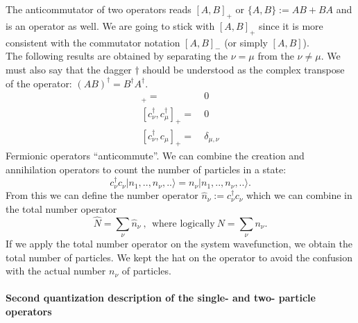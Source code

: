 \documentclass[../main.tex]{subfile}
\begin{document}
The anticommutator of two operators reads $[A,B]_{+}$ or $\{A,B\} := AB + BA$ and is an operator as well.
We are going to stick with $[A,B]_{+}$ since it is more consistent with the commutator notation $[A,B]_{-}$ (or simply $[A,B]$).\\

The following results are obtained by separating the $\nu = \mu$ from the $\nu \neq \mu$. We must also say that the dagger $\dagger$ 
should be understood as the complex transpose of the operator: $(AB)^{\dagger} = B^{\dagger}A^{\dagger}$.
\begin{align}
    [c_{\nu},c_{\mu}]_+ =&~ 0 \label{eq:Fermion1} \\
    [c^{\dagger}_{\nu},c^{\dagger}_{\mu}]_+ =&~0 \label{eq:Fermion2} \\
    [c^{\dagger}_{\nu},c_{\mu}]_+ =&~ \delta_{\mu,\nu}\label{eq:Fermion3} 
\end{align} 
Fermionic operators ``anticommute''.
We can combine the creation and annihilation operators to count the number of particles in a state:
\[
    c_{\nu}^{\dagger} c_{\nu} |n_{1},..,n_{\nu},..\rangle = n_{\nu}|n_{1},..,n_{\nu},..\rangle.
\]  
From this we can define the number operator $\hat{n}_{\nu}:= c_{\nu}^{\dagger} c_{\nu}$ which we can combine in the total number operator
\[
    \hat{N} = \sum_{\nu} \hat{n}_{\nu}~,~~\text{where logically}~ N = \sum_{\nu} n_{\nu}.
\]
If we apply the total number operator on the system wavefunction, we obtain the total number of particles.
We kept the hat on the operator to avoid the confusion with the actual number $n_{\nu}$ of particles.\\

\paragraph{Second quantization description of the single- and two- particle operators}$~$\\
\end{document}
